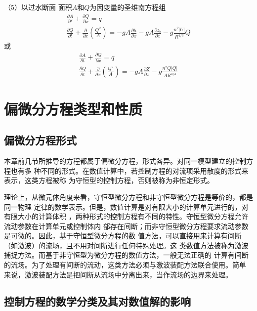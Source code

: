 （5）以过水断面
面积$A$和$Q$为因变量的圣维南方程组
\begin{equation}
  \begin{gathered}
    \frac{\partial A}{\partial t}
    +
    \frac{\partial Q}{\partial x}
    =
    q
    \\
    \frac{\partial Q}{\partial t}
    +
    \frac{\partial}{\partial x}\left(\frac{Q^{2}}{A}\right)
    =
    -gA\frac{\partial h}{\partial x}
    -gA\frac{\partial z_{b}}{\partial x}
    -g\frac{n^{2}|U|}{R^{4/3}}Q
  \end{gathered}
  \label{EqCGe_SV_AQ_1}
\end{equation}
或
\begin{equation}
  \begin{gathered}
    \frac{\partial A}{\partial t}
    +
    \frac{\partial Q}{\partial x}
    =
    q
    \\
    \frac{\partial Q}{\partial t}
    +
    \frac{\partial}{\partial x}\left(\frac{Q^{2}}{A}\right)
    =
    -
    gA\frac{\partial Z}{\partial x}
    -
    g\frac{n^{2}Q|Q|}{AR^{4/3}}
  \end{gathered}
  \label{EqCGe_SV_AQ_2}
\end{equation}

\section{偏微分方程类型和性质}
\subsection{偏微分方程形式}
本章前几节所推导的方程都属于偏微分方程，形式各异。对同一模型建立的控制方程也有多
种不同的形式。在数值计算中，若控制方程的对流项采用散度的形式来表示，这类方程被称
为守恒型的控制方程，否则被称为非恒定形式。

理论上，从微元体角度来看，守恒型微分方程和非守恒型微分方程是等价的，都是同一物理
定律的数学表示。但是，数值计算是对有限大小的计算单元进行的，对有限大小的计算体积
，两种形式的控制方程有不同的特性。守恒型微分方程允许流动参数在计算单元或控制体内
部存在间断；而非守恒型微分方程要求流动参数是可微的。因此，基于守恒型微分方程的数
值方法，可以直接用来计算有间断（如激波）的流场，且不用对间断进行任何特殊处理。这
类数值方法被称为激波捕捉方法。而基于非守恒型为微分方程的数值方法，一般无法正确的
计算有间断的流场。为了处理有间断的流动，这类方法必须与激波装配方法联合使用。简单
来说，激波装配方法是把间断从流场中分离出来，当作流场的边界来处理。

\subsection{控制方程的数学分类及其对数值解的影响}

